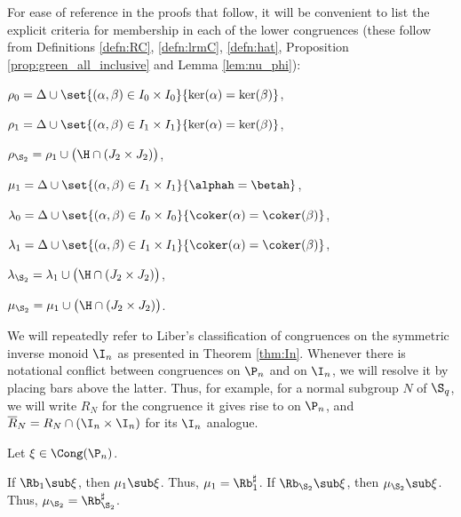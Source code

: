 %
For ease of reference in the proofs that follow, it will be convenient to list the explicit criteria for membership in each of the lower congruences (these follow from Definitions \ref{defn:RC}, \ref{defn:lrmC}, \ref{defn:hat}, Proposition \ref{prop:green_all_inclusive} and Lemma \ref{lem:nu_phi}):
\begin{itemize}\begin{multicols}{2}
\item $\rho_0=\Delta \cup \set{(\alpha,\beta)\in I_0\times I_0}{\ker(\alpha)=\ker(\beta)}$,

\item $\rho_1=\Delta \cup \set{(\alpha,\beta)\in I_1\times I_1}{\ker(\alpha)=\ker(\beta)}$,

\item $\rho_{\S_2}=\rho_1\cup\big( {\H}\cap(J_2\times J_2)\big)$,

\item $\mu_1= \Delta \cup \set{(\alpha,\beta)\in I_1\times I_1}{\alphah=\betah}$,

\item $\lambda_0=\Delta \cup \set{(\alpha,\beta)\in I_0\times I_0}{\coker(\alpha)=\coker(\beta)}$,

\item $\lambda_1=\Delta \cup \set{(\alpha,\beta)\in I_1\times I_1}{\coker(\alpha)=\coker(\beta)}$,

\item $\lambda_{\S_2}=\lambda_1\cup\big( {\H}\cap(J_2\times J_2)\big)$,

\item $\mu_{\S_2}=\mu_1\cup\big( {\H}\cap(J_2\times J_2)\big)$.
\end{multicols}\end{itemize}
%
We will repeatedly refer to Liber's classification of congruences on the symmetric inverse monoid $\I_n$ as presented in Theorem \ref{thm:In}.
Whenever there is notational conflict between congruences on $\P_n$ and on $\I_n$, we will resolve it by placing bars above the latter.
Thus, for example, for a normal subgroup $N$ of $\S_q$, we will write $R_N$ for the congruence it gives rise to on $\P_n$, and $\overline{R}_N=R_N\cap (\I_n\times\I_n)$ for its $\I_n$ analogue.



\begin{lemma}\label{lem:mn}
Let $\xi\in\Cong(\P_n)$.
\begin{itemize}
\begin{multicols}{2}
  If $\Rb_1\sub\xi$, then $\mu_1\sub\xi$.  Thus, $\mu_1=\Rb_1^\sharp$.
  If $\Rb_{\S_2}\sub\xi$, then $\mu_{\S_2}\sub\xi$.  Thus, $\mu_{\S_2}=\Rb_{\S_2}^\sharp$.
\end{multicols}
\end{itemize}
\end{lemma}


